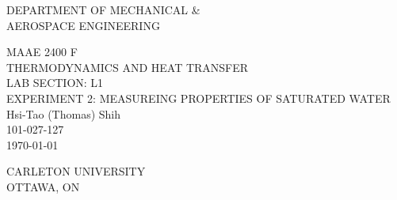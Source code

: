\begin{titlepage}
    \begin{center}
        \vspace{1cm}
 
        \large
        DEPARTMENT OF MECHANICAL \& \\
        AEROSPACE ENGINEERING
 
        \vspace{8em}
 
        \large
        MAAE 2400 F\\
        THERMODYNAMICS AND HEAT TRANSFER\\
        LAB SECTION: L1\\
        EXPERIMENT 2: MEASUREING PROPERTIES OF SATURATED WATER\\

        \vspace{1em}
        Hsi-Tao (Thomas) Shih\\
        101-027-127 \\
        \today

        \vfill
             
        \vspace{1em}
      
        \footnotesize
        CARLETON UNIVERSITY\\
        OTTAWA, ON
             
    \end{center}
\end{titlepage}